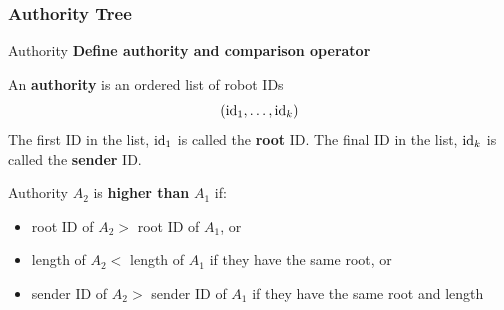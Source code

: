 \documentclass[10pt]{beamer}
\newcommand{\id}{{\rm id}}
\begin{document}
\subsubsection{Authority Tree}
\begin{frame}{Authority}
  \textbf{Define authority and comparison operator}
      \begin{definition}
      \small{An \textbf{authority} is an ordered list of robot IDs
        $$(\id_1, \ldots, \id_k)$$
        The first ID in the list, $\id_1$ is called the \textbf{root} ID.
        The final ID in the list, $\id_k$ is called the \textbf{sender} ID.}
    \end{definition}
    \begin{definition}
      \small{Authority $A_2$ is \textbf{higher than} $A_1$ if:}
      \begin{itemize}
      \item \small{root ID of $A_2 >$ root ID of $A_1$, or}
      \item \small{length of $A_2 <$  length of $A_1$ if they have the same root, or}
      \item \small{sender ID of $A_2 >$ sender ID of $A_1$ if they have the same root and length}
      \end{itemize}
    \end{definition}
\end{frame}

\end{document}
